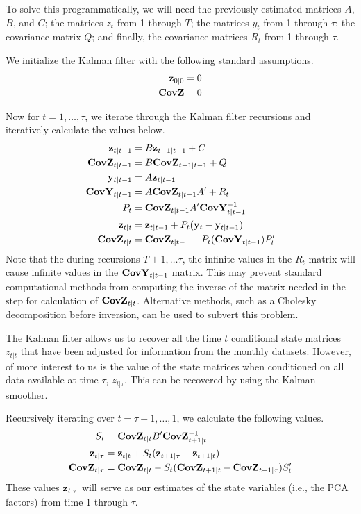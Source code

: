 \documentclass[11pt, letterpaper]{article}\usepackage[]{graphicx}\usepackage[]{color}
\newcommand{\vv}[1]{\textcolor{black}{\mathbf{#1}}}
\begin{document}
To solve this programmatically, we will need the previously estimated matrices $A$, $B$, and $C$; the matrices $z_t$ from 1 through $T$; the matrices $y_t$ from 1 through $\tau$; the covariance matrix $Q$; and finally, the covariance matrices $R_t$ from 1 through $\tau$.

We initialize the Kalman filter with the following standard assumptions. 
\begin{align*}
	\vv{z}_{0|0} = 0\\
	\vv{CovZ} = 0
\end{align*}

Now for $t = 1, \dots, \tau$, we iterate through the Kalman filter recursions and iteratively calculate the values below.
\begin{align*}
	\vv{z}_{t|t-1} &= B \vv{z}_{t-1|t-1} + C\\
	\vv{CovZ}_{t|t-1} &= B \vv{CovZ}_{t-1|t-1} + Q\\
	\vv{y}_{t|t-1} &= A \vv{z}_{t|t-1}\\
	\vv{CovY}_{t|t-1} &= A \vv{CovZ}_{t|t-1} A' + R_t\\
	P_t &= \vv{CovZ}_{t|t-1} A' \vv{CovY}^{-1}_{t|t-1}\\
	\vv{z}_{t|t} &= \vv{z}_{t|t-1} + P_t (\vv{y}_t - \vv{y}_{t|t-1})\\
	\vv{CovZ}_{t|t} &= \vv{CovZ}_{t|t-1} - P_t (\vv{CovY}_{t|t-1}) P'_t
\end{align*}
Note that the during recursions $T + 1, \dots \tau$, the infinite values in the $R_t$ matrix will cause infinite values in the $\vv{CovY}_{t|t-1}$ matrix. This may prevent standard computational methods from computing the inverse of the matrix needed in the step for calculation of $\vv{CovZ}_{t|t}$. Alternative methods, such as a Cholesky decomposition before inversion, can be used to subvert this problem.

The Kalman filter allows us to recover all the time $t$ conditional state matrices $z_{t|t}$ that have been adjusted for information from the monthly datasets. However, of more interest to us is the value of the state matrices when conditioned on all data available at time $\tau$, $z_{t|\tau}$. This can be recovered by using the Kalman smoother.

Recursively iterating over $t = \tau - 1, \dots, 1$, we calculate the following values. 
\begin{align*}
	S_{t} &= \vv{CovZ}_{t|t} B' \vv{CovZ}^{-1}_{t + 1|t}\\
	\vv{z}_{t|\tau} &= \vv{z}_{t|t} + S_t (\vv{z}_{t+1|\tau} - \vv{z}_{t + 1|t})\\
	\vv{CovZ}_{t|\tau} &= \vv{CovZ}_{t|t} - S_t(\vv{CovZ}_{t + 1|t} - \vv{CovZ}_{t + 1|\tau})S'_t
\end{align*}
These values $\vv{z}_{t|\tau}$ will serve as our estimates of the state variables (i.e., the PCA factors) from time 1 through $\tau$.
\end{document}
